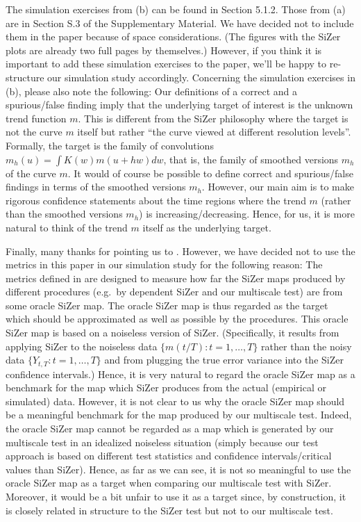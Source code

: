 \documentclass[a4paper,12pt]{article}
\begin{document}
\begin{enumerate}[label=(\arabic*),leftmargin=0.7cm]
\begin{enumerate}[label=(\alph*), leftmargin=0.7cm]
\end{enumerate}
The simulation exercises from (b) can be found in Section 5.1.2. Those from (a) are in Section S.3 of the Supplementary Material. We have decided not to include them in the paper because of space considerations. (The figures with the SiZer plots are already two full pages by themselves.) However, if you think it is important to add these simulation exercises to the paper, we'll be happy to re-structure our simulation study accordingly. \newline
%
Concerning the simulation exercises in (b), please also note the following: Our definitions of a correct and a spurious/false finding imply that the underlying target of interest is the unknown trend function $m$. This is different from the SiZer philosophy where the target is not the curve $m$ itself but rather ``the curve viewed at different resolution levels''. Formally, the target is the family of  convolutions $m_h(u) = \int K(w) m(u+hw) dw$, that is, the family of smoothed versions $m_h$ of the curve $m$. It would of course be possible to define correct and spurious/false findings in terms of the smoothed versions $m_h$. However, our main aim is to make rigorous confidence statements about the time regions where the trend $m$ (rather than the smoothed versions $m_h$) is increasing/decreasing. Hence, for us, it is more natural to think of the trend $m$ itself as the underlying target. 

Finally, many thanks for pointing us to \cite{HannigLeePark2013}. However, we have decided not to use the metrics in this paper in our simulation study for the following reason: The metrics defined in \cite{HannigLeePark2013} are designed to measure how far the SiZer maps produced by different procedures (e.g.\ by dependent SiZer and our multiscale test) are from some oracle SiZer map. The oracle SiZer map is thus regarded as the target which should be approximated as well as possible by the procedures. This oracle SiZer map is based on a noiseless version of SiZer. (Specifically, it results from applying SiZer to the noiseless data $\{ m(t/T): t=1,\ldots,T\}$ rather than the noisy data $\{ Y_{t,T}: t=1,\ldots,T\}$ and from plugging the true error variance into the SiZer confidence intervals.) Hence, it is very natural to regard the oracle SiZer map as a benchmark for the map which SiZer produces from the actual (empirical or simulated) data. 
However, it is not clear to us why the oracle SiZer map should be a meaningful benchmark for the map produced by our multiscale test. Indeed, the oracle SiZer map cannot be regarded as a map which is generated by our multiscale test in an idealized noiseless situation (simply because our test approach is based on different test statistics and confidence intervals/critical values than SiZer). Hence, as far as we can see, it is not so meaningful to use the oracle SiZer map as a target when comparing our multiscale test with SiZer. Moreover, it would be a bit unfair to use it as a target since, by construction, it is closely related in structure to the SiZer test but not to our multiscale test. 



\end{enumerate}
\end{document}
